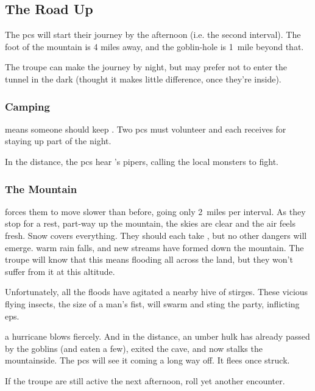 \begin{multicols}{2}
\renewcommand\npcsymbol{\glsfmttext{evening}}
\subsection[the Road Up]{The Road Up}
The \glspl{pc} will start their journey by the afternoon (i.e. the second \gls{interval}).
The foot of the mountain is 4 miles away, and the goblin-hole is 1~mile beyond that.

The troupe can make the journey by night, but may prefer not to enter the tunnel in the dark (thought it makes little difference, once they're inside).

\subsubsection{Camping}
means someone should keep .
Two \glspl{pc} must volunteer and each receives  for staying up part of the night.

In the distance, the \glspl{pc} hear 's pipers, calling the local \glspl{monster} to fight.

\subsubsection{The Mountain}
forces them to move slower than before, going only 2~miles per \gls{interval}.
As they stop for a rest, part-way up the mountain,
\ifcase\value{temperature}%
  the skies are clear and the air feels fresh.
  Snow covers everything.
  They should each take , but no other dangers will emerge.
\or%
  warm rain falls, and new streams have formed down the mountain.
  The troupe will know that this means flooding all across the land, but they won't suffer from it at this altitude.

  Unfortunately, all the floods have agitated a nearby hive of stirges.
  These vicious flying insects, the size of a man's fist, will swarm
  and sting the party, inflicting \glspl{ep}.%

  \stirgeSwarm
\else%
  a hurricane blows fiercely.
  And in the distance, an umber hulk has already passed by the goblins (and eaten a few), exited the cave, and now stalks the mountainside.
  The \glspl{pc} will see it coming a long way off.
  It flees once struck.

  \umberhulk
\fi%

If the troupe are still active the next afternoon, roll yet another encounter.%


\end{multicols}
